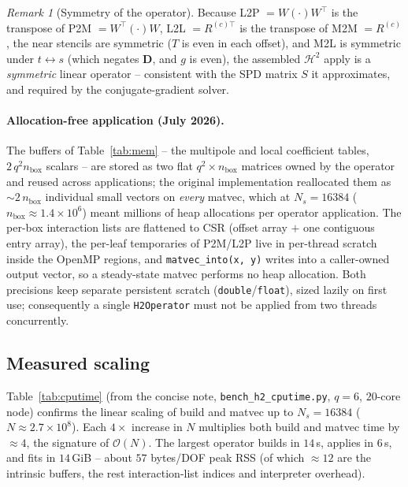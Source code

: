 \documentclass[11pt,a4paper]{article}
\newcommand{\Order}{\mathcal{O}}
\newcommand{\Htwo}{\mathcal{H}^2}
\newcommand{\code}[1]{\texttt{#1}}
\theoremstyle{definition}
\theoremstyle{remark}
\newtheorem{remark}{Remark}
\begin{document}
\begin{remark}[Symmetry of the operator]
\label{rem:symmetry}
Because L2P $=W(\cdot)W^\top$ is the transpose of P2M $=W^\top(\cdot)W$, L2L
$=R^{(c)\top}$ is the transpose of M2M $=R^{(c)}$, the near stencils are
symmetric ($T$ is even in each offset), and M2L is symmetric under
$t\leftrightarrow s$ (which negates $\mathbf D$, and $g$ is even), the assembled
$\Htwo$ apply is a \emph{symmetric} linear operator -- consistent with the SPD
matrix $S$ it approximates, and required by the conjugate-gradient solver.
\end{remark}

\paragraph{Allocation-free application (July 2026).}
The buffers of Table~\ref{tab:mem} -- the multipole and local coefficient
tables, $2\,q^2 n_{\text{box}}$ scalars -- are stored as two flat
$q^2\times n_{\text{box}}$ matrices owned by the operator and reused across
applications; the original implementation reallocated them as
$\sim\!2\,n_{\text{box}}$ individual small vectors on \emph{every} matvec,
which at $N_s=16384$ ($n_{\text{box}}\approx1.4\times10^6$) meant millions of
heap allocations per operator application. The per-box interaction lists are
flattened to CSR (offset array $+$ one contiguous entry array), the per-leaf
temporaries of P2M/L2P live in per-thread scratch inside the OpenMP regions,
and \code{matvec\_into(x, y)} writes into a caller-owned output vector, so a
steady-state matvec performs no heap allocation. Both precisions keep separate
persistent scratch (\code{double}/\code{float}), sized lazily on first use;
consequently a single \code{H2Operator} must not be applied from two threads
concurrently.

\subsection{Measured scaling}

Table~\ref{tab:cputime} (from the concise note, \code{bench\_h2\_cputime.py},
$q=6$, $20$-core node) confirms the linear scaling of build and matvec up to
$N_s=16384$ ($N\approx2.7\times10^8$). Each $4\times$ increase in $N$ multiplies
both build and matvec time by $\approx4$, the signature of $\Order(N)$. The
largest operator builds in $14$\,s, applies in $6$\,s, and fits in $14$\,GiB --
about $57$ bytes/DOF peak RSS (of which $\approx12$ are the intrinsic buffers, the
rest interaction-list indices and interpreter overhead).
\end{document}
